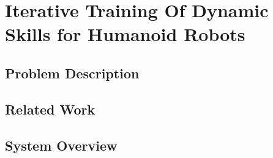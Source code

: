 \section{Iterative Training Of Dynamic Skills for Humanoid Robots}


\subsection{Problem Description}

\subsection{Related Work}

\subsection{System Overview}
